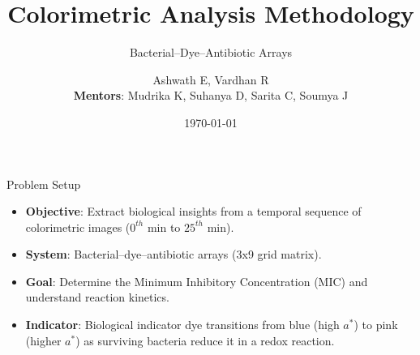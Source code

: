 \documentclass{beamer}
\title{Colorimetric Analysis Methodology}
\subtitle{Bacterial–Dye–Antibiotic Arrays}
\author{Ashwath E, Vardhan R\\
\textbf{Mentors}: Mudrika K, Suhanya D, Sarita C, Soumya J}
\date{\today}
\begin{document}
\frame{\titlepage}

\begin{frame}{Problem Setup}
\begin{itemize}
    \item \textbf{Objective}: Extract biological insights from a temporal sequence of colorimetric images ($0^{th}$ min to $25^{th}$ min).
    \item \textbf{System}: Bacterial–dye–antibiotic arrays (3x9 grid matrix).
    \item \textbf{Goal}: Determine the Minimum Inhibitory Concentration (MIC) and understand reaction kinetics.
    \item \textbf{Indicator}: Biological indicator dye transitions from blue (high $a^*$) to pink (higher $a^*$) as surviving bacteria reduce it in a redox reaction.
\end{itemize}
\end{frame}
\end{document}

